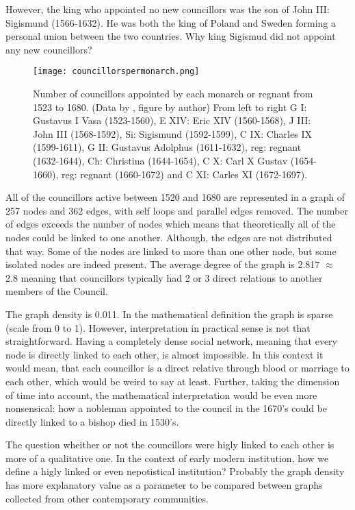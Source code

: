 However, the king who appointed no new councillors was the son of John III: Sigismund (1566-1632). He was both the king of Poland and Sweden forming a personal union between the two countries. Why king Sigismud did not appoint any new councillors? 

\begin{figure}
	\texttt{[image: councillorspermonarch.png]}
	\centering
	\caption[Number of councillors appointed by each ruler between 1523-1680] {Number of councillors appointed by each monarch or regnant from 1523 to 1680. (Data by \cite{councillorsDS}, figure by author) From left to right G I: Gustavus I Vasa (1523-1560), E XIV: Eric XIV (1560-1568), J III: John III (1568-1592), Si: Sigismund (1592-1599), C IX: Charles IX (1599-1611), G II: Gustavus Adolphus (1611-1632), reg: regnant (1632-1644), Ch: Christina (1644-1654), C X: Carl X Gustav (1654-1660), reg: regnant (1660-1672) and C XI: Carles XI (1672-1697).}
	\centering
\end{figure}

All of the councillors active between 1520 and 1680 are represented in a graph of 257 nodes and 362 edges, with self loops and parallel edges removed. The number of edges exceeds the number of nodes which means that theoretically all of the nodes could be linked to one another. Although, the edges are not distributed that way. Some of the nodes are linked to more than one other node, but some isolated nodes are indeed present. The average degree of the graph is 2.817 $\approx$ 2.8 meaning that councillors typically had 2 or 3 direct relations to another members of the Council.

The graph density is 0.011. In the mathematical definition the graph is sparse (scale from 0 to 1). However, interpretation in practical sense is not that straightforward. Having a completely dense social network, meaning that every node is directly linked to each other, is almost impossible. In this context it would mean, that each councillor is a direct relative through blood or marriage to each other, which would be weird to say at least. Further, taking the dimension of time into account, the mathematical interpretation would be even more nonsensical: how a nobleman appointed to the council in the 1670's could be directly linked to a bishop died in 1530's. 

The question wheither or not the councillors were higly linked to each other is more of a qualitative one. In the context of early modern institution, how we define a higly linked or even nepotistical institution? Probably the graph density has more explanatory value as a parameter to be compared between graphs collected from other contemporary communities.

